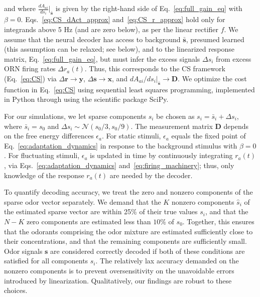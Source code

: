 \documentclass[9pt,lineno]{elife}
\begin{document}
and where $\frac{dA_{ai}}{ds_i}\big|_{\bar{\mathbf s}}$ is given by the right-hand side of Eq.~\ref{eq:full_gain_eq} with $\beta = 0$. Eqs.~\ref{eq:CS_dAct_approx} and~\ref{eq:CS_r_approx} hold only for integrands above 5 Hz (and are zero below), as per the linear rectifier $f$. We assume that the neural decoder has access to background $\bar{\mathbf s}$, presumed learned (this assumption can be relaxed; see below), and to  the linearized response matrix, Eq.~\ref{eq:full_gain_eq}, but must infer the excess signals $\Delta s_i$ from excess ORN firing rates $\Delta r_a(t)$. Thus, this corresponds to the CS framework (Eq.~\ref{eq:CS})  via $\Delta \mathbf {r} \rightarrow \mathbf y$, $\Delta \mathbf s \rightarrow \mathbf x$, and $dA_{ai}/{ds_i}\big|_{\bar {\mathbf s}} \rightarrow \mathbf D$. We optimize the cost function in Eq.~\ref{eq:CS} using sequential least squares programming, implemented in Python through using the scientific package SciPy. 



For our simulations, we let sparse components $s_i$ be chosen as $s_i = \bar s_i + \Delta s_i$, where $\bar s_i= s_0$ and $\Delta s_i \sim \mathcal {N} (s_0/3, s_0/9)$. The measurement matrix $\mathbf D$ depends on the free energy differences $\epsilon_a$. For static stimuli, $\epsilon_a$ equals the fixed point of Eq.~\ref{eq:adaptation_dynamics} in response to the background stimulus with $\beta = 0$. For fluctuating stimuli, $\epsilon_a$ is updated in time by continuously integrating  $r_a(t)$, via Eqs.~\ref{eq:adaptation_dynamics} and~\ref{eq:firing_machinery}; thus, only knowledge of the response $r_a(t)$ are needed by the decoder. 

{\color{blue} To quantify decoding accuracy, we treat the zero and nonzero components of the sparse odor vector separately. We demand that the $K$ nonzero components $\hat s_i$ of the estimated sparse vector are within 25\% of their true values $s_i$, and that the $N - K$ zero components are estimated less than $10\%$ of $s_0$. Together, this ensures that the odorants comprising the odor mixture are estimated sufficiently close to their concentrations, and that the remaining components are sufficiently small. Odor signals $\mathbf s$ are considered correctly decoded if both of these conditions are satisfied for all components $s_i$. The relatively lax accuracy demanded on the nonzero components is to prevent oversensitivity on the unavoidable errors introduced by linearization. Qualitatively, our findings are robust to these choices. }
\end{document}
